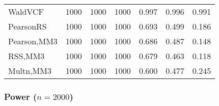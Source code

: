 \documentclass[
]{article}
\begin{document}
\begin{table}[H]
{\begin{tabular}[t]{lrrrrrr}
\hspace{1em}WaldVCF & 1000 & 1000 & 1000 & 0.997 & 0.996 & 0.991\\
\hspace{1em}PearsonRS & 1000 & 1000 & 1000 & 0.693 & 0.499 & 0.186\\
\hspace{1em}Pearson,MM3 & 1000 & 1000 & 1000 & 0.686 & 0.487 & 0.148\\
\hspace{1em}RSS,MM3 & 1000 & 1000 & 1000 & 0.679 & 0.463 & 0.118\\
\hspace{1em}Multn,MM3 & 1000 & 1000 & 1000 & 0.600 & 0.477 & 0.245\\
\bottomrule
\end{tabular}}
\end{table}

\hypertarget{power-n2000-3}{%
\subsubsection{\texorpdfstring{Power
(\(n=2000\))}{Power (n=2000)}}\label{power-n2000-3}}
\end{document}
